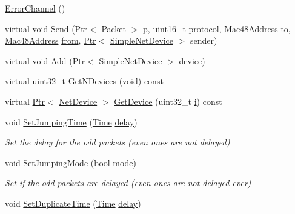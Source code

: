 \begin{DoxyCompactItemize}
\item 
\hyperlink{classns3_1_1ErrorChannel_a609db330be988b25eb7c1e90cac030a7}{Error\+Channel} ()
\item 
virtual void \hyperlink{classns3_1_1ErrorChannel_a9bf289445c6da2b659ebbc46193c824e}{Send} (\hyperlink{classns3_1_1Ptr}{Ptr}$<$ \hyperlink{classns3_1_1Packet}{Packet} $>$ \hyperlink{lte__link__budget__x2__handover__measures_8m_ac9de518908a968428863f829398a4e62}{p}, uint16\+\_\+t protocol, \hyperlink{classns3_1_1Mac48Address}{Mac48\+Address} to, \hyperlink{classns3_1_1Mac48Address}{Mac48\+Address} \hyperlink{lte__amc_8m_a1b4c81ff74eb1a626b5ade44c81004b3}{from}, \hyperlink{classns3_1_1Ptr}{Ptr}$<$ \hyperlink{classns3_1_1SimpleNetDevice}{Simple\+Net\+Device} $>$ sender)
\item 
virtual void \hyperlink{classns3_1_1ErrorChannel_aa60d546be074192b4a760e0721da2604}{Add} (\hyperlink{classns3_1_1Ptr}{Ptr}$<$ \hyperlink{classns3_1_1SimpleNetDevice}{Simple\+Net\+Device} $>$ device)
\item 
virtual uint32\+\_\+t \hyperlink{classns3_1_1ErrorChannel_a6eacac2eb65817cd121c517f7207d596}{Get\+N\+Devices} (void) const 
\item 
virtual \hyperlink{classns3_1_1Ptr}{Ptr}$<$ \hyperlink{classns3_1_1NetDevice}{Net\+Device} $>$ \hyperlink{classns3_1_1ErrorChannel_a78a2a6018d946406f2acdfa66bfa450c}{Get\+Device} (uint32\+\_\+t \hyperlink{lte__uplink__power__control_8m_a6f6ccfcf58b31cb6412107d9d5281426}{i}) const 
\item 
void \hyperlink{classns3_1_1ErrorChannel_a907fdc086d939d84eb4e612d0eac1d84}{Set\+Jumping\+Time} (\hyperlink{classns3_1_1Time}{Time} \hyperlink{mmwave_2model_2fading-traces_2fading__trace__generator_8m_a7964e6aa8f61a9d28973c8267a606ad8}{delay})
\begin{DoxyCompactList}\small\item\em Set the delay for the odd packets (even ones are not delayed) \end{DoxyCompactList}\item 
void \hyperlink{classns3_1_1ErrorChannel_aa30b3b76ca1fc19aa68e28bd21431131}{Set\+Jumping\+Mode} (bool mode)
\begin{DoxyCompactList}\small\item\em Set if the odd packets are delayed (even ones are not delayed ever) \end{DoxyCompactList}\item 
void \hyperlink{classns3_1_1ErrorChannel_ae18408e96832d1a96425299b661b02e6}{Set\+Duplicate\+Time} (\hyperlink{classns3_1_1Time}{Time} \hyperlink{mmwave_2model_2fading-traces_2fading__trace__generator_8m_a7964e6aa8f61a9d28973c8267a606ad8}{delay})

\end{DoxyCompactItemize}
